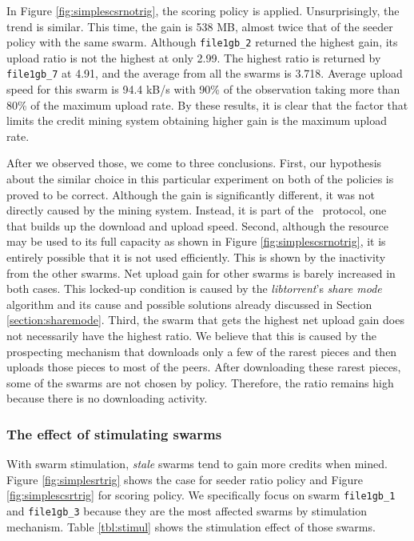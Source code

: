 In Figure \ref{fig:simplescsrnotrig}, the scoring policy is applied. Unsurprisingly, the trend is similar. This time, the gain is 538 MB, almost twice that of the seeder policy with the same swarm.  Although \texttt{file1gb\_2} returned the highest gain, its upload ratio is not the highest at only 2.99.  The highest ratio is returned by \texttt{file1gb\_7} at 4.91, and the average from all the swarms is 3.718. Average upload speed for this swarm is 94.4 kB/s with 90\% of the observation taking more than 80\% of the maximum upload rate. By these results, it is clear that the factor that limits the credit mining system obtaining higher gain is the maximum upload rate. 

After we observed those, we come to three conclusions. First, our hypothesis about the similar choice in this particular experiment on both of the policies is proved to be correct. Although the gain is significantly different, it was not directly caused by the mining system. Instead, it is part of the \bt~protocol, one that builds up the download and upload speed. Second, although the resource may be used to its full capacity as shown in Figure \ref{fig:simplescsrnotrig}, it is entirely possible that it is not used efficiently. This is shown by the inactivity from the other swarms. Net upload gain for other swarms is barely increased in both cases. This locked-up condition is caused by the \textit{libtorrent}'s \textit{share mode} algorithm and its cause and possible solutions already discussed in Section \ref{section:sharemode}. Third, the swarm that gets the highest net upload gain does not necessarily have the highest ratio. We believe that this is caused by the prospecting mechanism that downloads only a few of the rarest pieces and then uploads those pieces to most of the peers. After downloading these rarest pieces, some of the swarms are not chosen by policy. Therefore, the ratio remains high because there is no downloading activity.

\subsubsection{The effect of stimulating swarms}
With swarm stimulation, \textit{stale} swarms tend to gain more credits when mined. Figure \ref{fig:simplesrtrig} shows the case for seeder ratio policy and Figure \ref{fig:simplescsrtrig} for scoring policy. We specifically focus on swarm \texttt{file1gb\_1} and \texttt{file1gb\_3} because they are the most affected swarms by stimulation mechanism. Table \ref{tbl:stimul} shows the stimulation effect of those swarms.

